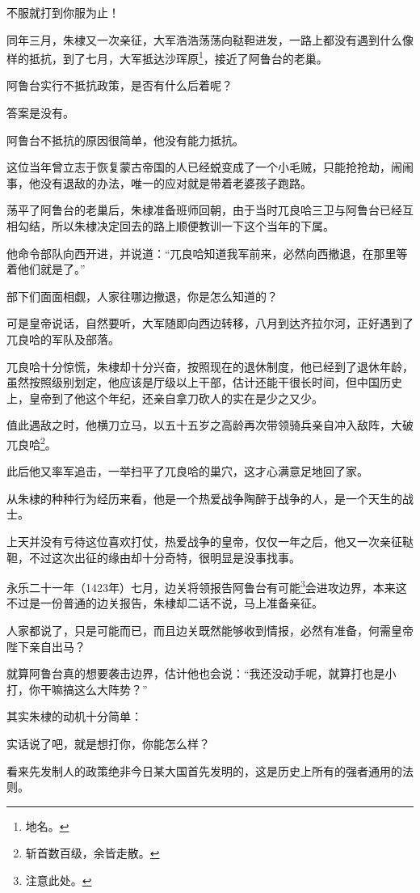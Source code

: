 \begin{multicols}{\theparacolNo}
不服就打到你服为止！

同年三月，朱棣又一次亲征，大军浩浩荡荡向鞑靼进发，一路上都没有遇到什么像样的抵抗，到了七月，大军抵达沙珲原\footnote{地名。}，接近了阿鲁台的老巢。

阿鲁台实行不抵抗政策，是否有什么后着呢？

答案是没有。

阿鲁台不抵抗的原因很简单，他没有能力抵抗。

这位当年曾立志于恢复蒙古帝国的人已经蜕变成了一个小毛贼，只能抢抢劫，闹闹事，他没有退敌的办法，唯一的应对就是带着老婆孩子跑路。

荡平了阿鲁台的老巢后，朱棣准备班师回朝，由于当时兀良哈三卫与阿鲁台已经互相勾结，所以朱棣决定回去的路上顺便教训一下这个当年的下属。

他命令部队向西开进，并说道：“兀良哈知道我军前来，必然向西撤退，在那里等着他们就是了。”

部下们面面相觑，人家往哪边撤退，你是怎么知道的？

可是皇帝说话，自然要听，大军随即向西边转移，八月到达齐拉尔河，正好遇到了兀良哈的军队及部落。

兀良哈十分惊慌，朱棣却十分兴奋，按照现在的退休制度，他已经到了退休年龄，虽然按照级别划定，他应该是厅级以上干部，估计还能干很长时间，但中国历史上，皇帝到了他这个年纪，还亲自拿刀砍人的实在是少之又少。

值此遇敌之时，他横刀立马，以五十五岁之高龄再次带领骑兵亲自冲入敌阵，大破兀良哈\footnote{斩首数百级，余皆走散。}。

此后他又率军追击，一举扫平了兀良哈的巢穴，这才心满意足地回了家。

从朱棣的种种行为经历来看，他是一个热爱战争陶醉于战争的人，是一个天生的战士。

上天并没有亏待这位喜欢打仗，热爱战争的皇帝，仅仅一年之后，他又一次亲征鞑靼，不过这次出征的缘由却十分奇特，很明显是没事找事。

永乐二十一年（1423年）七月，边关将领报告阿鲁台有可能\footnote{注意此处。}会进攻边界，本来这不过是一份普通的边关报告，朱棣却二话不说，马上准备亲征。

人家都说了，只是可能而已，而且边关既然能够收到情报，必然有准备，何需皇帝陛下亲自出马？

就算阿鲁台真的想要袭击边界，估计他也会说：“我还没动手呢，就算打也是小打，你干嘛搞这么大阵势？”

其实朱棣的动机十分简单：

实话说了吧，就是想打你，你能怎么样？

看来先发制人的政策绝非今日某大国首先发明的，这是历史上所有的强者通用的法则。


\end{multicols}
